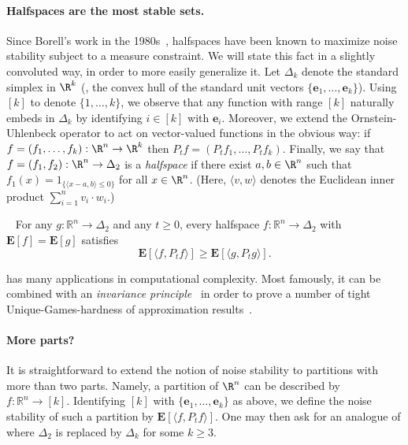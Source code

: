 \documentclass{toc}
\begin{document}
\paragraph{Halfspaces are the most stable sets.}
Since Borell's work in the 1980s~\cite{Borell:85},
halfspaces have been known to
maximize noise stability subject to a measure constraint.
We will state this
fact in a slightly convoluted way, in order to more easily generalize it.  Let
$\Delta_k$ denote the standard simplex in $\R^k$ (\ie, the convex hull
of  the standard unit vectors $\{\mathbf{e}_1, \ldots, \mathbf{e}_k\}$).
Using $[k]$ to denote $\{1,\ldots, k\}$, we observe that any function with range $[k]$ naturally embeds in $\Delta_k$ by identifying $i
\in [k]$ with $\mathbf{e}_i$. 
Moreover, we extend the Ornstein-Uhlenbeck operator to act on vector-valued
functions in the obvious way: if $f = (f_1, \dots, f_k): \R^n \to \R^k$
then $P_t f = (P_t f_1, \dots, P_t f_k)$.
Finally, we say that $f = (f_1, f_2): \R^n \to \Delta_2$ is a \emph{halfspace} if
there exist $a, b \in \R^n$ such that $f_1(x) = 1_{\{\langle x - a, b\rangle \le 0\}}$
for all $x \in \R^n$.
(Here, $\langle v, w \rangle$ denotes
the Euclidean inner product $\sum_{i=1}^n v_i \cdot w_i$.)

\begin{theorem}[Borell]~\label{thm:Borell}
For any $g: \mathbb{R}^n \rightarrow \Delta_2$ and any $t \ge 0$, every halfspace
$f: \mathbb{R}^n \rightarrow \Delta_2$ with $\mathbf{E}[f] = \mathbf{E}[g]$
satisfies 
$$
\mathbf{E}[\langle f, P_t f \rangle] \ge \mathbf{E}[\langle g, P_t g \rangle]. 
$$
\end{theorem}

 has many applications in computational complexity.
Most famously, it can be combined with an
\emph{invariance principle}~\cite{MOO10}
in order to prove a number of tight
%
%
%
%
%
%
%
Unique-Games-hardness of approximation results~\cite{KKMO04}.

\paragraph{More parts?}
It is straightforward to extend the notion of noise stability to partitions
with more than two parts. Namely, a partition of $\R^n$ can be described by $f:
\mathbb{R}^n \rightarrow [k]$. Identifying $[k]$ with $\{\mathbf{e}_1, \dots,
\mathbf{e}_k\}$ as above, we define the noise stability of such a partition by
$\mathbf{E}[\langle f, P_t f \rangle]$.
One may then ask for an analogue of  where
$\Delta_2$ is replaced by $\Delta_k$ for some $k \ge 3$.
\end{document}
